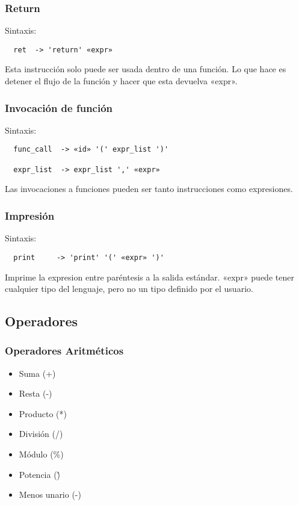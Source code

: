\documentclass[12pt, spanish]{report}
\begin{document}
\subsubsection{Return}
Sintaxis:
\begin{verbatim}
  ret  -> 'return' «expr» 
\end{verbatim}

Esta instrucci\'on solo puede ser usada dentro de una funci\'on. Lo que
hace es detener el flujo de la funci\'on y hacer que esta devuelva «expr».

\subsubsection{Invocación de función}
Sintaxis:
\begin{verbatim}
  func_call  -> «id» '(' expr_list ')'
  
  expr_list  -> expr_list ',' «expr»
\end{verbatim}

Las invocaciones a funciones pueden ser tanto instrucciones como
expresiones.

\subsubsection{Impresi\'on}
Sintaxis:
\begin{verbatim}
  print     -> 'print' '(' «expr» ')' 
\end{verbatim}

Imprime la expresion entre par\'entesis a la salida est\'andar. «expr»
puede tener cualquier tipo del lenguaje, pero no un tipo definido por el usuario.

\subsection{Operadores}
\label{sec:ops}

\subsubsection{Operadores Aritm\'eticos}
\begin{itemize}
\item Suma     (+)
\item Resta    (-)
\item Producto (*)
\item Divisi\'on  (/)
\item M\'odulo (\%)
\item Potencia (\^)
\item Menos unario (-)
\end{itemize}
\end{document}
